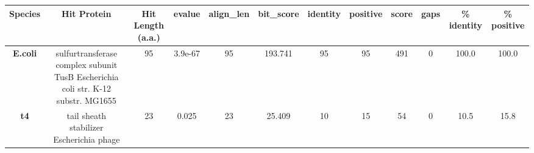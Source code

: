 \begin{tabular}{|c|c|c|c|c|c|c|c|c|c|c|c|} \hline
\textbf{Species} & \textbf{Hit Protein} & \textbf{Hit Length (a.a.)} & \textbf{evalue} & \textbf{align\_len} & \textbf{bit\_score} & \textbf{identity} & \textbf{positive} & \textbf{score} & \textbf{gaps} & \textbf{\% identity} & \textbf{\% positive} \\ \hline
\textbf{E.coli} & sulfurtransferase complex subunit TusB Escherichia coli str. K-12 substr. MG1655 & 95 & 3.9e-67 & 95 & 193.741 & 95 & 95 & 491 & 0 & 100.0 & 100.0\\
\textbf{t4} & tail sheath stabilizer Escherichia phage  & 23 & 0.025 & 23 & 25.409 & 10 & 15 & 54 & 0 & 10.5 & 15.8\\
\hline \end{tabular}
